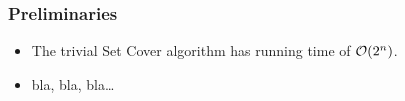 \begin{frame}\frametitle{Preliminaries}
\begin{itemize}
\pause \item The trivial Set Cover algorithm has running time of ${\cal O}(2^n)$.
\pause \item bla, bla, bla\ldots
\end{itemize}

\end{frame}